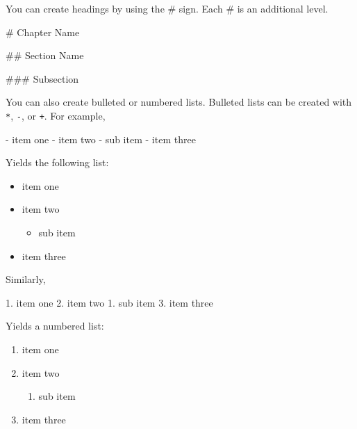 \documentclass[12pt,english]{kuthesis}
\providecommand{\tightlist}{%
  \setlength{\itemsep}{0pt}\setlength{\parskip}{0pt}}
\newenvironment{Shaded}{\begin{snugshade}}{\end{snugshade}}
\newcommand{\FloatTok}[1]{\textcolor[rgb]{0.00,0.00,0.81}{#1}}
\newcommand{\FunctionTok}[1]{\textcolor[rgb]{0.00,0.00,0.00}{#1}}
\newcommand{\NormalTok}[1]{#1}
\begin{document}
You can create headings by using the \# sign. Each \# is an additional level.

\begin{Shaded}
\begin{Highlighting}[]
\FunctionTok{# Chapter Name}

\FunctionTok{## Section Name}

\FunctionTok{### Subsection}
\end{Highlighting}
\end{Shaded}

You can also create bulleted or numbered lists. Bulleted lists can be created with \texttt{*}, \texttt{-}, or \texttt{+}. For example,

\begin{Shaded}
\begin{Highlighting}[]
\NormalTok{- }\FloatTok{item one}
\FloatTok{- item two}
\FloatTok{    - sub item}
\FloatTok{- item three}
\end{Highlighting}
\end{Shaded}

Yields the following list:

\begin{itemize}
\tightlist
\item
  item one
\item
  item two

  \begin{itemize}
  \tightlist
  \item
    sub item
  \end{itemize}
\item
  item three
\end{itemize}

Similarly,

\begin{Shaded}
\begin{Highlighting}[]
\NormalTok{1. }\FloatTok{item one}
\FloatTok{2. item two}
\FloatTok{    1. sub item}
\FloatTok{3. item three}
\end{Highlighting}
\end{Shaded}

Yields a numbered list:

\begin{enumerate}
\def\labelenumi{\arabic{enumi}.}
\tightlist
\item
  item one
\item
  item two

  \begin{enumerate}
  \def\labelenumii{\arabic{enumii}.}
  \tightlist
  \item
    sub item
  \end{enumerate}
\item
  item three
\end{enumerate}
\end{document}
